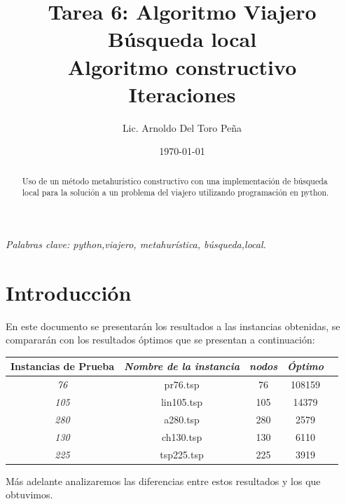 \documentclass[12pt,a4paper]{article}
\author{Lic. Arnoldo Del Toro Peña}
\title{Tarea 6: Algoritmo Viajero \\ Búsqueda local \\ \tiny{Algoritmo constructivo \\ Iteraciones}}
\date{\today}
\begin{document}
\maketitle



\thispagestyle{empty}
\begin{abstract}
    Uso de un método metahurístico constructivo con una implementación de búsqueda local para la solución a un problema del viajero utilizando programación en python.
\end{abstract}
{\centering \textit{Palabras clave: python,viajero, metahurística, búsqueda,local.}}
\section{Introducción}
En este documento se presentarán los resultados a las instancias obtenidas, se compararán con los resultados óptimos que se presentan a continuación:
\begin{table}[h!]
\centering
\begin{tabular}{|c|c|c|c|c|}
\hline
\multicolumn{1}{|l|}{\textbf{Instancias de Prueba}} & \multicolumn{1}{l|}{\textit{Nombre de la instancia}}  & \multicolumn{1}{c|}{\textit{nodos}} & \textit{Óptimo} \\ \hline
\textit{76}                                          &  pr76.tsp                                & 76                            & 108159            \\ \hline
\textit{105}                                          & lin105.tsp                                 & 105                            & 14379             \\ \hline
\textit{280}                                          & a280.tsp                                 & 280                           &2579            \\ \hline
\textit{130}                                          & ch130.tsp                                 & 130                            & 6110             \\ \hline
\textit{225}                                          & tsp225.tsp                                 & 225                            & 3919             \\ \hline

\end{tabular}
\end{table}

Más adelante analizaremos las diferencias entre estos resultados y los que obtuvimos.
\end{document}
